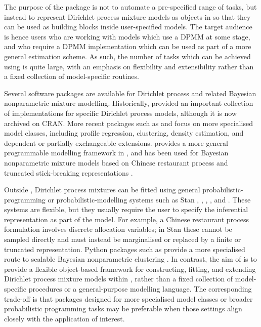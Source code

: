 \documentclass[nojss]{jss}
\begin{document}
The purpose of the  package is not to automate a pre-specified range of tasks, but instead to represent Dirichlet process mixture models as objects in  so that they can be used as building blocks inside user-specified models. The target audience is hence users who are working with models which use a DPMM at some stage, and who require a DPMM implementation which can be used as part of a more general estimation scheme. As such, the number of tasks which can be achieved using  is quite large, with an emphasis on flexibility and extensibility rather than a fixed collection of model-specific routines.

Several software packages are available for Dirichlet process and related Bayesian nonparametric mixture modelling. Historically,  \citep{Jara2011DPpackage} provided an important collection of implementations for specific Dirichlet process models, although it is now archived on CRAN. More recent  packages such as  \citep{Liverani2015PReMiuM} and  \citep{Corradin2021BNPmix} focus on more specialised model classes, including profile regression, clustering, density estimation, and dependent or partially exchangeable extensions.  provides a more general programmable modelling framework in , and has been used for Bayesian nonparametric mixture models based on Chinese restaurant process and truncated stick-breaking representations \citep{deValpine2017NIMBLE,Wehrhahn2018NIMBLEBNP}.

Outside , Dirichlet process mixtures can be fitted using general probabilistic-programming or probabilistic-modelling systems such as Stan \citep{Carpenter2017Stan},  \citep{pymc2023},  \citep{Bingham2019Pyro},  \citep{Dillon2017TensorFlowDistributions}, and  \citep{Ge2018Turing}. These systems are flexible, but they usually require the user to specify the inferential representation as part of the model. For example, a Chinese restaurant process formulation involves discrete allocation variables; in Stan these cannot be sampled directly and must instead be marginalised or replaced by a finite or truncated representation. Python packages such as  provide a more specialised route to scalable Bayesian nonparametric clustering \citep{Hughes2014BNPy}. In contrast, the aim of  is to provide a flexible object-based framework for constructing, fitting, and extending Dirichlet process mixture models within , rather than a fixed collection of model-specific procedures or a general-purpose modelling language. The corresponding trade-off is that packages designed for more specialised model classes or broader probabilistic programming tasks may be preferable when those settings align closely with the application of interest.
\end{document}
